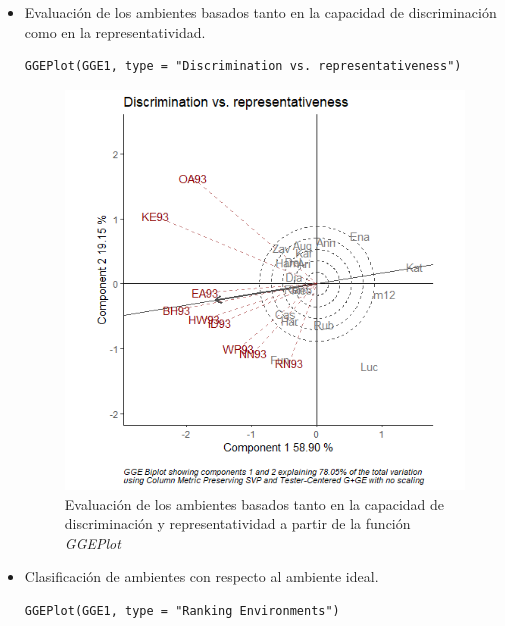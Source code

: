 \begin{itemize}
\item Evaluación de los ambientes basados tanto en la capacidad de discriminación como en la representatividad.

\begin{lstlisting}
GGEPlot(GGE1, type = "Discrimination vs. representativeness")
\end{lstlisting}

\begin{figure}[h!]
	\begin{center}
		\includegraphics[width=12cm]{./Graficos/Discriminationvsrepresentativeness.png}
	\end{center}
	\caption{Evaluación de los ambientes basados tanto en la capacidad de discriminación y representatividad a partir de la función \emph{GGEPlot}}
\end{figure}



\item Clasificación de ambientes con respecto al ambiente ideal.

\begin{lstlisting}
GGEPlot(GGE1, type = "Ranking Environments")
\end{lstlisting}


\end{itemize}
